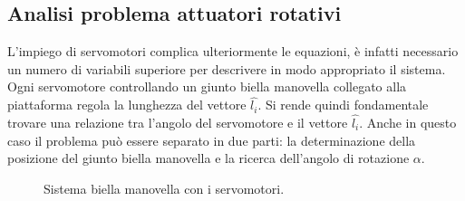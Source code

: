 \documentclass[11pt]{article}
\begin{document}
\subsection{Analisi problema attuatori rotativi}
L'impiego di servomotori complica ulteriormente le equazioni, è infatti necessario un numero di variabili superiore per descrivere in modo appropriato il sistema. Ogni servomotore controllando un giunto biella manovella collegato alla piattaforma regola la lunghezza del vettore $\hat{l_i}$. Si rende quindi fondamentale trovare una relazione tra l'angolo del servomotore e il vettore $\hat{l_i}$. Anche in questo caso il problema può essere separato in due parti: la determinazione della posizione del giunto biella manovella e la ricerca dell'angolo di rotazione $\alpha$.

\begin{figure}[h!]
\centering
{}
\caption{Sistema biella manovella con i servomotori.} \label{fig:rv}
\end{figure}
\end{document}
